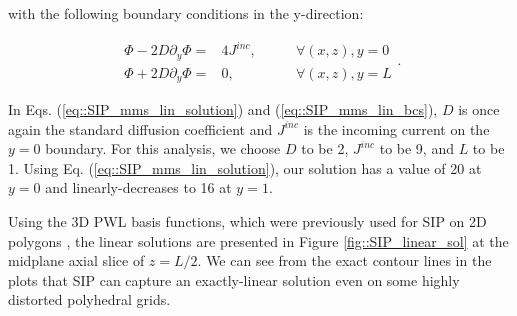 \noindent with the following boundary conditions in the y-direction:

\begin{equation}
\label{eq::SIP_mms_lin_bcs}
\begin{aligned}
\Phi - 2D \partial_y \Phi = & 4 J^{inc}, \qquad & \forall (x,z),y=0 \\
\Phi + 2D \partial_y \Phi = & 0, \qquad & \forall (x,z),y=L
\end{aligned}.
\end{equation}

\noindent In Eqs. (\ref{eq::SIP_mms_lin_solution}) and (\ref{eq::SIP_mms_lin_bcs}), $D$ is once again the standard diffusion coefficient and $J^{inc}$ is the incoming current on the $y=0$ boundary. For this analysis, we choose $D$ to be 2, $J^{inc}$ to be 9, and $L$ to be 1. Using Eq. (\ref{eq::SIP_mms_lin_solution}), our solution has a value of 20 at $y=0$ and linearly-decreases to 16 at $y=1$.

Using the 3D PWL basis functions, which were previously used for SIP on 2D polygons \cite{ragusa2015discontinuous}, the linear solutions are presented in Figure \ref{fig::SIP_linear_sol} at the midplane axial slice of $z=L/2$. We can see from the exact contour lines in the plots that SIP can capture an exactly-linear solution even on some highly distorted polyhedral grids.


